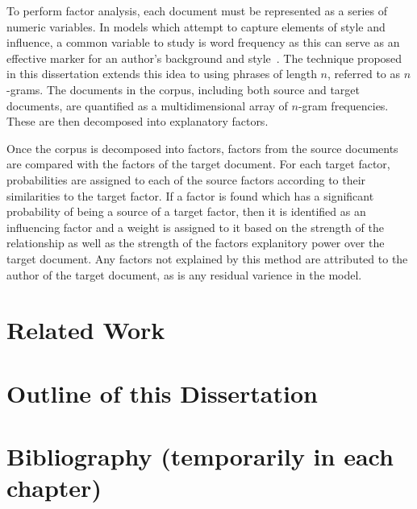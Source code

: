 \documentclass[../dissertation.tex]{subfiles}
\begin{document}
To perform factor analysis, each document must be represented as a
series of numeric variables.  In models which attempt to capture
elements of style and influence, a common variable to study is word
frequency as this can serve as an effective marker for an author's
background and style~\cite{craig2009, burrows2017}.  The technique
proposed in this dissertation extends this idea to using phrases of
length $n$, referred to as $n$-grams.  The documents in the corpus,
including both source and target documents, are quantified as a
multidimensional array of $n$-gram frequencies.  These are then
decomposed into explanatory factors.

Once the corpus is decomposed into factors, factors from the source
documents are compared with the factors of the target document.  For
each target factor, probabilities are assigned to each of the source
factors according to their similarities to the target factor.  If a
factor is found which has a significant probability of being a source
of a target factor, then it is identified as an influencing factor and
a weight is assigned to it based on the strength of the relationship
as well as the strength of the factors explanitory power over the
target document.  Any factors not explained by this method are
attributed to the author of the target document, as is any residual
varience in the model.

\section{Related Work}

\section{Outline of this Dissertation}

\section{Bibliography (temporarily in each chapter)}


\end{document}
